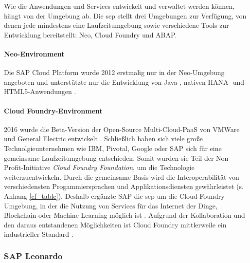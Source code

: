 \noindent Wie die Anwendungen und Services entwickelt und verwaltet werden können, hängt von der Umgebung ab. Die \ac{scp} stellt drei Umgebungen zur Verfügung, von denen jede mindestens eine Laufzeitumgebung sowie verschiedene Tools zur Entwicklung bereitstellt: Neo, Cloud Foundry und ABAP.

\paragraph{Neo-Environment} Die SAP Cloud Platform wurde 2012 erstmalig nur in der Neo-Umgebung angeboten und unterstützte nur die Entwicklung von Java-, nativen HANA- und HTML5-Anwendungen \citep{Elsner2018}.

\paragraph{Cloud Foundry-Environment} 2016 wurde die Beta-Version der Open-Source Multi-Cloud-PaaS von VMWare und General Electric entwickelt \citep{Utecht2018}. Schließlich haben sich viele große Technolgieunternehmen wie IBM, Pivotal, Google oder SAP sich für eine gemeinsame Laufzeitumgebung entschieden. Somit wurden sie Teil der Non-Profit-Initiative \textit{Cloud Foundry Foundation}, um die Technologie weiterzuentwickeln. Durch die gemeinsame Basis wird die Interoperabilität von verschiedensten Progammiersprachen und Applikationsdiensten gewährleistet (s. Anhang \ref{cf_table}).  Deshalb ergänzte SAP die \ac{scp} um die Cloud Foundry-Umgebung, in der die Nutzung von Services für das Internet der Dinge, Blockchain oder Machine Learning möglich ist \citep{Elsner2018}. Aufgrund der Kollaboration und den daraus entstandenen Möglichkeiten ist Cloud Foundry mittlerweile ein industrieller Standard \citep{Acharya2019}.

\subsubsection{SAP Leonardo}

